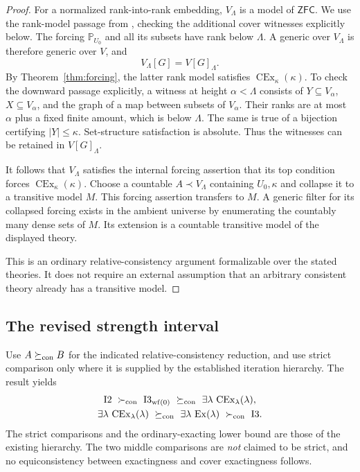 \documentclass[11pt,letterpaper]{article}
\theoremstyle{definition}
\newcommand{\ZFC}{\mathsf{ZFC}}
\newcommand{\Ex}{\operatorname{Ex}}
\newcommand{\CEx}{\operatorname{CEx}}
\newcommand{\Itwo}{\mathrm{I2}}
\newcommand{\Ithree}{\mathrm{I3}}
\newcommand{\Iwf}{\mathrm{I3}_{\mathrm{wf}(0)}}
\newcommand{\PP}{\mathbb P}
\begin{document}
\begin{proof}
For a normalized rank-into-rank embedding, $V_\Lambda$ is a model of
$\ZFC$. We use the rank-model passage from
\cite[proof of Corollary~5.5]{abgl}, checking the additional cover
witnesses explicitly below. The forcing $\PP_{U_0}$ and all its subsets have rank below
$\Lambda$. A generic over $V_\Lambda$ is therefore generic over $V$,
and
\[
 V_\Lambda[G]=V[G]_\Lambda.
\]
By Theorem~\ref{thm:forcing}, the latter rank model satisfies
$\CEx_\kappa(\kappa)$. To check the downward passage explicitly, a
witness at height $\alpha<\Lambda$ consists of $Y\subseteq V_\alpha$,
$X\subseteq V_\alpha$, and the graph of a map between subsets of
$V_\alpha$. Their ranks are at most $\alpha$ plus a fixed finite amount,
which is below $\Lambda$. The same is true of a bijection certifying
$|Y|\leq\kappa$. Set-structure satisfaction is absolute. Thus the
witnesses can be retained in $V[G]_\Lambda$.

It follows that $V_\Lambda$ satisfies the internal forcing assertion
that its top condition forces $\CEx_\kappa(\kappa)$. Choose a countable
$A\prec V_\Lambda$ containing $U_0,\kappa$ and collapse it to a
transitive model $M$. This forcing assertion transfers to $M$.
A generic filter for its collapsed forcing exists in the ambient universe
by enumerating the countably many dense sets of $M$. Its extension is a
countable transitive model of the displayed theory.

This is an ordinary relative-consistency argument formalizable over the
stated theories. It does not require an external assumption that an
arbitrary consistent theory already has a transitive model.
\end{proof}

\subsection{The revised strength interval}

Use $A\succeq_{\rm con}B$ for the indicated relative-consistency
reduction, and use strict comparison only where it is supplied by the
established iteration hierarchy. The result yields
\begin{equation}\label{eq:strengthchain}
\begin{gathered}
 \Itwo\ \succ_{\rm con}\ \Iwf
 \ \succeq_{\rm con}\
       \exists\lambda\,\CEx_\lambda(\lambda),\\
 \exists\lambda\,\CEx_\lambda(\lambda)
 \ \succeq_{\rm con}\ \exists\lambda\,\Ex(\lambda)
 \ \succ_{\rm con}\ \Ithree.
\end{gathered}
\end{equation}
The strict comparisons and the ordinary-exacting lower bound are those
of the existing hierarchy.\cite[Theorem~5.10 and Corollary~5.11]{abgl}
The two middle comparisons are \emph{not} claimed to be strict, and
no equiconsistency between exactingness and cover exactingness follows.
\end{document}
